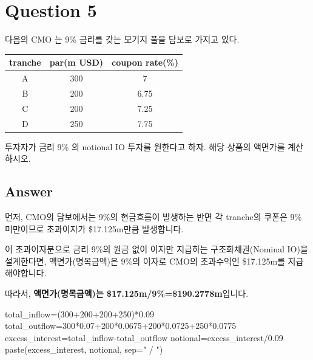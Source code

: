 \documentclass[
  letterpaper,
  DIV=11,
  numbers=noendperiod]{scrreprt}
\newenvironment{Shaded}{\begin{snugshade}}{\end{snugshade}}
\newcommand{\AttributeTok}[1]{\textcolor[rgb]{0.40,0.45,0.13}{#1}}
\newcommand{\DecValTok}[1]{\textcolor[rgb]{0.68,0.00,0.00}{#1}}
\newcommand{\FloatTok}[1]{\textcolor[rgb]{0.68,0.00,0.00}{#1}}
\newcommand{\FunctionTok}[1]{\textcolor[rgb]{0.28,0.35,0.67}{#1}}
\newcommand{\NormalTok}[1]{\textcolor[rgb]{0.00,0.23,0.31}{#1}}
\newcommand{\OtherTok}[1]{\textcolor[rgb]{0.00,0.23,0.31}{#1}}
\newcommand{\SpecialCharTok}[1]{\textcolor[rgb]{0.37,0.37,0.37}{#1}}
\newcommand{\StringTok}[1]{\textcolor[rgb]{0.13,0.47,0.30}{#1}}
\begin{document}
\section*{Question 5}\label{question-5}


다음의 CMO 는 9\% 금리를 갖는 모기지 풀을 담보로 가지고 있다.

\begin{longtable}[]{@{}ccc@{}}
\toprule\noalign{}
tranche & par(m USD) & coupon rate(\%) \\
\midrule\noalign{}
\endhead
\bottomrule\noalign{}
\endlastfoot
A & 300 & 7 \\
B & 200 & 6.75 \\
C & 200 & 7.25 \\
D & 250 & 7.75 \\
\end{longtable}

투자자가 금리 9\% 의 notional IO 투자를 원한다고 하자. 해당 상품의
액면가를 계산하시오.

\subsection*{Answer}\label{answer-4}

먼저, CMO의 담보에서는 9\%의 현금흐름이 발생하는 반면 각 tranche의
쿠폰은 9\% 미만이므로 초과이자가 \$17.125m만큼 발생합니다.

이 초과이자분으로 금리 9\%의 원금 없이 이자만 지급하는
구조화채권(Nominal IO)을 설계한다면, 액면가(명목금액)은 9\%의 이자로
CMO의 초과수익인 \$17.125m를 지급해야합니다.

따라서, \textbf{액면가(명목금액)는 \$17.125m/9\%=\$190.2778m}입니다.

\begin{Shaded}
\begin{Highlighting}[]
\NormalTok{total\_inflow}\OtherTok{=}\NormalTok{(}\DecValTok{300}\SpecialCharTok{+}\DecValTok{200}\SpecialCharTok{+}\DecValTok{200}\SpecialCharTok{+}\DecValTok{250}\NormalTok{)}\SpecialCharTok{*}\FloatTok{0.09}
\NormalTok{total\_outflow}\OtherTok{=}\DecValTok{300}\SpecialCharTok{*}\FloatTok{0.07}\SpecialCharTok{+}\DecValTok{200}\SpecialCharTok{*}\FloatTok{0.0675}\SpecialCharTok{+}\DecValTok{200}\SpecialCharTok{*}\FloatTok{0.0725}\SpecialCharTok{+}\DecValTok{250}\SpecialCharTok{*}\FloatTok{0.0775}
\NormalTok{excess\_interest}\OtherTok{=}\NormalTok{total\_inflow}\SpecialCharTok{{-}}\NormalTok{total\_outflow}
\NormalTok{notional}\OtherTok{=}\NormalTok{excess\_interest}\SpecialCharTok{/}\FloatTok{0.09}
\FunctionTok{paste}\NormalTok{(excess\_interest, notional, }\AttributeTok{sep=}\StringTok{" / "}\NormalTok{)}
\end{Highlighting}
\end{Shaded}
\end{document}
